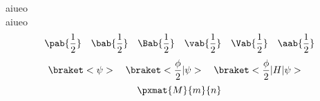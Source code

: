 \documentclass[paper=a4paper]{jlreq}
\begin{document}
aiueo\cite{Hemingway1952}\\
aiueo\\
\[
    \pab{\frac{1}{2}}    \quad %
    \bab{\frac{1}{2}}    \quad %
    \Bab{\frac{1}{2}}    \quad %
    \vab{\frac{1}{2}}    \quad %
    \Vab{\frac{1}{2}}    \quad %
    \aab{\frac{1}{2}}          %
\]
\[
    \braket< \psi >                           \quad
    \braket< \frac{\phi}{2} | \psi >          \quad
    \braket< \frac{\phi}{2} | H | \psi >      \quad
\]
\[
    \pxmat{M}{m}{n}
\]

\\
\\
\printbibliography
\end{document}
